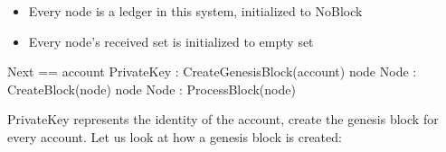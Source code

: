 \documentclass{report}
\begin{document}
\begin{itemize}
    \item Every node is a ledger in this system, initialized to NoBlock
    \item Every node's received set is initialized to empty set
\end{itemize}

\begin{tla}
Next ==
    \/ \E account \in PrivateKey : CreateGenesisBlock(account)
    \/ \E node \in Node : CreateBlock(node)
    \/ \E node \in Node : ProcessBlock(node)
\end{tla}
\begin{tlatex}
%
%
%
\end{tlatex}
\newline

PrivateKey represents the identity of the account, create the genesis block for
every account. Let us look at how a genesis block is created:\newline
\end{document}
